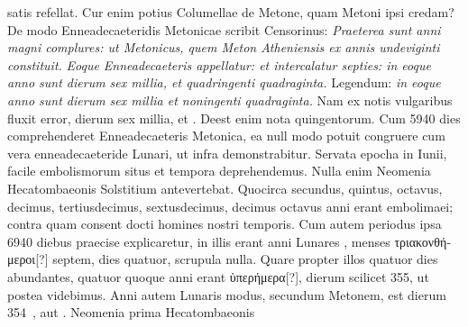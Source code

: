 satis refellat.
%
Cur enim potius Columellae de Metone, quam
Metoni ipsi credam?
De modo Enneadecaeteridis Metonicae
scribit Censorinus:
 \textit{Praeterea sunt anni magni complures: ut Metonicus,
quem Meton Atheniensis ex annis undeviginti constituit.}
\textit{Eoque
Enneadecaeteris appellatur: et intercalatur septies: in eoque
anno sunt dierum sex millia, et quadringenti quadraginta.}
Legendum:
\textit{in eoque anno sunt dierum sex millia et noningenti quadraginta.}
Nam ex notis vulgaribus fluxit error, dierum sex millia,
 et .
Deest enim 
 nota quingentorum.
Cum 5940 dies comprehenderet
Enneadecaeteris Metonica, ea null modo potuit
congruere cum vera enneadecaeteride Lunari, ut infra demonstrabitur.
Servata epocha in  Iunii, facile embolismorum
situs et tempora deprehendemus.
Nulla enim Neomenia Hecatombaeonis
Solstitium antevertebat.
Quocirca secundus, quintus,
octavus, decimus, tertiusdecimus, sextusdecimus, decimus octavus
anni erant embolimaei; contra quam consent docti homines nostri
temporis.
Cum autem periodus ipsa 6940 diebus praecise explicaretur,
in illis erant anni Lunares ,
 menses \textgreek{τριακονθήμεροι[?]} septem,
dies quatuor, scrupula nulla.
Quare propter illos quatuor dies abundantes,
quatuor quoque anni erant \textgreek{ὑπερήμερα[?]}, dierum scilicet
355, ut postea videbimus.
Anni autem Lunaris modus, secundum
Metonem, est dierum 354~, aut .
Neomenia prima Hecatombaeonis
